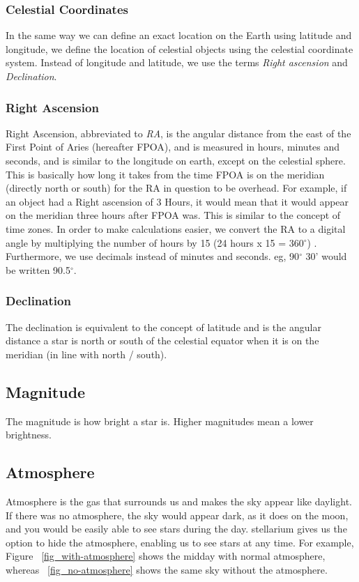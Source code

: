 \subsubsection{Celestial Coordinates}
In the same way we can define an exact location on the Earth using latitude and longitude, we define the location of celestial objects using the celestial coordinate system. Instead of longitude and latitude, we use the terms \textit{Right ascension} and \textit{Declination}. 

\subsubsection{Right Ascension}
Right Ascension, abbreviated to \textit{RA}, is the angular distance from the east of the First Point of Aries (hereafter FPOA), and is measured in hours, minutes and seconds, and is similar to the longitude on earth, except on the celestial sphere. This is basically how long it takes from the time FPOA is on the meridian (directly north or south) for the RA in question to be overhead. For example, if an object had a Right ascension of 3 Hours, it would mean that it would appear on the meridian three hours after FPOA was.  This is similar to the concept of time zones. In order to make calculations easier, we convert the RA to a digital angle by multiplying the number of hours by 15 (24 hours x 15 = 360$^{\circ}$) . Furthermore, we use decimals instead of minutes and seconds. eg, 90$^{\circ}$ 30' would be written 90.5$^{\circ}$. 

\subsubsection{Declination}
The declination is equivalent to the concept of latitude and is the angular distance a star is north or south of the celestial equator when it is on the meridian (in line with north / south).  

\subsection{Magnitude}
The magnitude is how bright a star is. Higher magnitudes mean a lower brightness.

\subsection{Atmosphere}
Atmosphere is the gas that surrounds us and makes the sky appear like daylight. If there was no atmosphere, the sky would appear dark, as it does on the moon, and you would be easily able to see stars during the day. stellarium gives us the option to hide the atmosphere, enabling us to see stars at any time. For example, Figure ~\ref{fig_with-atmosphere} shows the midday with normal atmosphere, whereas ~\ref{fig_no-atmosphere} shows the same sky without the atmosphere.

